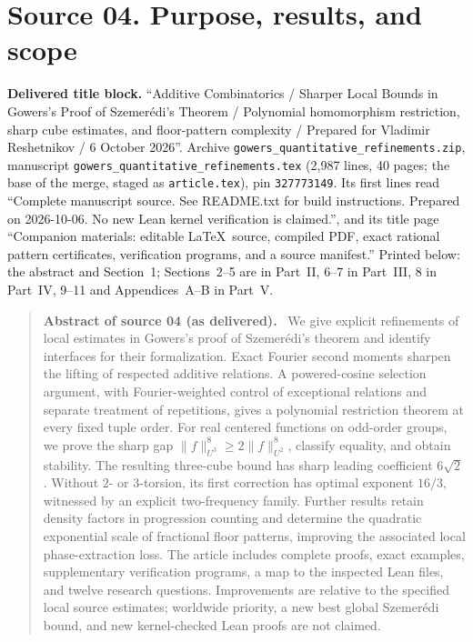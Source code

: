 \documentclass[11pt,letterpaper]{article}
\numberwithin{equation}{section}
\theoremstyle{definition}
\theoremstyle{remark}
\newcommand{\1}{\mathbf 1}
\newcommand{\file}[1]{\nolinkurl{#1}}
\newcommand{\srcnote}[2]{\par\noindent{\small\textit{Source #1, delivered #2.}}\par}
\newenvironment{partabstract}[1]{\begin{quote}\small\noindent\textbf{Abstract of source #1 (as delivered).}\ }{\end{quote}}
\newcommand{\partsource}[1]{\par\noindent\begin{minipage}{\textwidth}\small #1\end{minipage}\par\medskip}
\begin{document}
\section[{Source 04: Purpose, results, and scope}]{Source 04. Purpose, results, and scope}\label{gsr:fm:04:sec:d1}
\srcnote{04}{Section 1}
\partsource{\textbf{Delivered title block.} ``Additive Combinatorics / Sharper Local Bounds in Gowers's Proof of Szemer\'edi's Theorem / Polynomial homomorphism restriction, sharp cube estimates, and floor-pattern complexity / Prepared for Vladimir Reshetnikov / 6 October 2026''. Archive \file{gowers\_quantitative\_refinements.zip}, manuscript \file{gowers\_quantitative\_refinements.tex} (2,987 lines, 40 pages; the base of the merge, staged as \file{article.tex}), pin \texttt{327773149}. Its first lines read ``Complete manuscript source. See README.txt for build instructions. Prepared on 2026-10-06. No new Lean kernel verification is claimed.'', and its title page ``Companion materials: editable \LaTeX\ source, compiled PDF, exact rational pattern certificates, verification programs, and a source manifest.'' Printed below: the abstract and Section~1; Sections~2--5 are in Part~II, 6--7 in Part~III, 8 in Part~IV, 9--11 and Appendices~A--B in Part~V.}
\begin{partabstract}{04}
\noindent
We give explicit refinements of local estimates in Gowers's proof of
Szemer\'edi's theorem and identify interfaces for their formalization.
Exact Fourier second moments sharpen the lifting of respected additive
relations.  A powered-cosine selection argument, with Fourier-weighted
control of exceptional relations and separate treatment of repetitions,
gives a polynomial restriction theorem at every fixed tuple order.
For real centered functions on odd-order groups, we prove the sharp gap
\(\|f\|_{U^3}^8\geq2\|f\|_{U^2}^8\), classify equality, and obtain stability.
The resulting three-cube bound has sharp leading coefficient
\(6\sqrt2\).  Without \(2\)- or \(3\)-torsion, its first correction has
optimal exponent \(16/3\), witnessed by an explicit two-frequency family.
Further results retain density factors in progression counting and
determine the quadratic exponential scale of fractional floor patterns,
improving the associated local phase-extraction loss.
The article includes complete proofs, exact examples, supplementary
verification programs, a map to the inspected Lean files, and twelve
research questions.  Improvements are relative to the specified local
source estimates; worldwide priority, a new best global Szemer\'edi bound,
and new kernel-checked Lean proofs are not claimed.
\end{partabstract}
\label{gsr:fm:04:sec:introduction}
\end{document}
